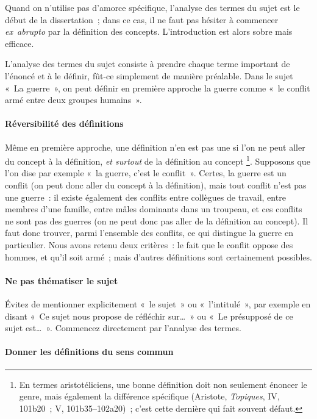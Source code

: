 \documentclass[a4paper]{article}
\begin{document}
Quand on n'utilise pas d'amorce spécifique, l'analyse des termes du
sujet est le début de la dissertation ; dans ce cas, il ne faut pas
hésiter à commencer \emph{ex abrupto} par la définition des concepts.
L'introduction est alors sobre mais efficace.

L'analyse des termes du sujet consiste à prendre chaque terme important
de l'énoncé et à le définir, fût-ce simplement de manière préalable.
Dans le sujet « La guerre », on peut définir en première approche la
guerre comme « le conflit armé entre deux groupes humains ».
\paragraph{Réversibilité des définitions}
\label{sec-2-2-1-1}


Même en première approche, une définition n'en est pas une si l'on ne
peut aller du concept à la définition, \emph{et surtout} de la définition au
concept \footnote{En termes aristotéliciens, une bonne définition doit non seulement
    énoncer le genre, mais également la différence spécifique (Aristote,
    \emph{Topiques}, IV, 101b20 ; V, 101b35--102a20) ; c'est cette dernière
    qui fait souvent défaut.
 }. Supposons que l'on dise par exemple « la guerre, c'est le
conflit ». Certes, la guerre est un conflit (on peut donc aller du
concept à la définition), mais tout conflit n'est pas une guerre : il
existe également des conflits entre collègues de travail, entre membres
d'une famille, entre mâles dominants dans un troupeau, et ces conflits
ne sont pas des guerres (on ne peut donc pas aller de la définition au
concept). Il faut donc trouver, parmi l'ensemble des conflits, ce qui
distingue la guerre en particulier. Nous avons retenu deux critères : le
fait que le conflit oppose des hommes, et qu'il soit armé ; mais
d'autres définitions sont certainement possibles.
\paragraph{Ne pas thématiser le sujet}
\label{sec-2-2-1-2}


Évitez de mentionner explicitement « le sujet » ou « l'intitulé », par
exemple en disant « Ce sujet nous propose de réfléchir sur\ldots{} » ou « Le
présupposé de ce sujet est\ldots{} ». Commencez directement par l'analyse des
termes.
\paragraph{Donner les définitions du sens commun}
\label{sec-2-2-1-3}
\end{document}
